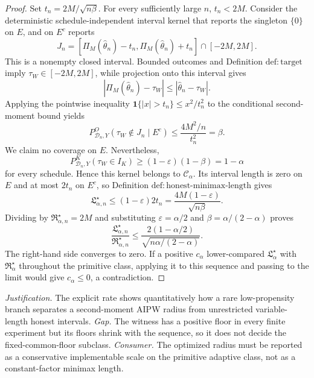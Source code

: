 \documentclass{article}
\begin{document}
\begin{proof}
Set \(t_n=2M/\sqrt{n\beta}\).  For every sufficiently large \(n\), \(t_n<2M\).  Consider the deterministic schedule-independent interval kernel that reports the singleton \(\{0\}\) on \(E\), and on \(E^c\) reports
\[
 J_n=
 [\Pi_M(\widehat\theta_n)-t_n,
   \Pi_M(\widehat\theta_n)+t_n]
 \cap[-2M,2M].
\]
This is a nonempty closed interval.  Bounded outcomes and Definition \(\mathrm{def:target}\) imply \(\tau_W\in[-2M,2M]\), while projection onto this interval gives
\[
 |\Pi_M(\widehat\theta_n)-\tau_W|
 \le|\widehat\theta_n-\tau_W|.
\]
Applying the pointwise inequality \(\mathbf 1\{|x|>t_n\}\le x^2/t_n^2\) to the conditional second-moment bound yields
\[
 P^O_{\mathcal D_n,Y}(\tau_W\notin J_n\mid E^c)
 \le\frac{4M^2/n}{t_n^2}=\beta.
\]
We claim no coverage on \(E\).  Nevertheless,
\[
 P^K_{\mathcal D_n,Y}(\tau_W\in I_K)
 \ge(1-\varepsilon)(1-\beta)=1-\alpha
\]
for every schedule.  Hence this kernel belongs to \(\mathcal C_\alpha\).  Its interval length is zero on \(E\) and at most \(2t_n\) on \(E^c\), so Definition \(\mathrm{def:honest\text{-}minimax\text{-}length}\) gives
\[
 \mathfrak L_{\alpha,n}^\star
 \le(1-\varepsilon)2t_n
 =\frac{4M(1-\varepsilon)}{\sqrt{n\beta}}.
\]
Dividing by \(\mathfrak R_{\alpha,n}^\star=2M\) and substituting \(\varepsilon=\alpha/2\) and \(\beta=\alpha/(2-\alpha)\) proves
\[
 \frac{\mathfrak L_{\alpha,n}^\star}{\mathfrak R_{\alpha,n}^\star}
 \le
 \frac{2(1-\alpha/2)}{\sqrt{n\alpha/(2-\alpha)}}.
\]
The right-hand side converges to zero.  If a positive \(c_\alpha\) lower-compared \(\mathfrak L_\alpha^\star\) with \(\mathfrak R_\alpha^\star\) throughout the primitive class, applying it to this sequence and passing to the limit would give \(c_\alpha\le0\), a contradiction.
\end{proof}
\par\smallskip\noindent \textit{Justification.} The explicit rate shows quantitatively how a rare low-propensity branch separates a second-moment AIPW radius from unrestricted variable-length honest intervals. \textit{Gap.} The witness has a positive floor in every finite experiment but its floors shrink with the sequence, so it does not decide the fixed-common-floor subclass. \textit{Consumer.} The optimized radius must be reported as a conservative implementable scale on the primitive adaptive class, not as a constant-factor minimax length.
\end{document}
